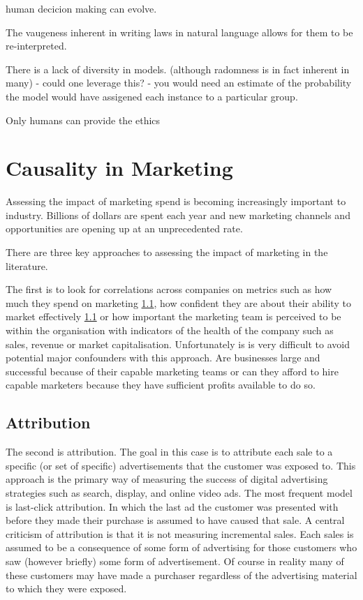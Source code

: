 \documentclass[11pt,a4paper,oneside]{book}
\theoremstyle{plain}
\theoremstyle{definition}
\begin{document}
human decicion making can evolve. 

The vaugeness inherent in writing laws in natural language allows for them to be re-interpreted. 

There is a lack of diversity in models. (although radomness is in fact inherent in many) - could one leverage this? - you would need an estimate of the probability the model would have assigened each instance to a particular group. 

Only humans can provide the ethics




\chapter{Causality in Marketing}
Assessing the impact of marketing spend is becoming increasingly important to industry. Billions of dollars \cite{XXX} are spent each year and new marketing channels and opportunities are opening up at an unprecedented rate. 

There are three key approaches to assessing the impact of marketing in the literature. 

The first is to look for correlations across companies on metrics such as how much they spend on marketing \ref{}, how confident they are about their ability to market effectively \ref{} or how important the marketing team is perceived to be within the organisation with indicators of the health of the company such as sales, revenue or market capitalisation. Unfortunately is is very difficult to avoid potential major confounders with this approach. Are businesses large and successful because of their capable marketing teams or can they afford to hire capable marketers because they have sufficient profits available to do so. 

\section{Attribution}
The second is attribution. The goal in this case is to attribute each sale to a specific (or set of specific) advertisements that the customer was exposed to. This approach is the primary way of measuring the success of digital advertising strategies such as search, display, and online video ads. The most frequent model is last-click attribution. In which the last ad the customer was presented with before they made their purchase is assumed to have caused that sale. A central criticism of attribution is that it is not measuring incremental sales. Each sales is assumed to be a consequence of some form of advertising for those customers who saw (however briefly) some form of advertisement. Of course in reality many of these customers may have made a purchaser regardless of the advertising material to which they were exposed. 
\end{document}
